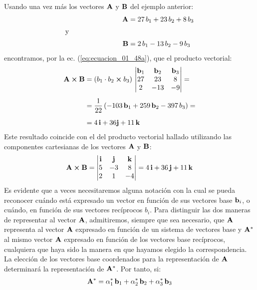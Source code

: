 Usando una vez más los vectores $\vb{A}$ y $\vb{B}$ del ejemplo anterior:
\begin{align*}
    \vb{A} &= 27 \, b_{1} + 23 \, b_{2} + 8 \, b_{3} \\[0.25em]
    \text{y} \hspace{3cm} &{} \\[0.25em]
    \vb{B} &= 2 \, b_{1} - 13 \, b_{2} - 9 \, b_{3}
\end{align*}
encontramos, por la ec. (\ref{eq:ecuacion_01_48a}), que el producto vectorial:
\begin{eqnarray*}
\begin{aligned}
\vb{A} \cp \vb{B} &= \left( b_{1} \cdot b_{2} \cp b_{3} \right) \, \mdet{
    \vb{b}_{1} & \vb{b}_{2} & \vb{b}_{3} \\
    27 & 23 & 8 \\
    2 & -13 & -9
} = \\[0.5em]
&= \dfrac{1}{22} \left( -103 \, \vb{b}_{1} + 259 \, \vb{b}_{2} - 397 \, b_{3} \right) = \\[0.5em]
&= 4 \, \vb{i} + 36 \vb{j} + 11 \, \vb{k}
\end{aligned}
\end{eqnarray*}
Este resultado coincide con el del producto vectorial hallado utilizando las componentes cartesianas de los vectores $\vb{A}$ y $\vb{B}$:
\begin{align*}
    \vb{A} \cp \vb{B} = \mdet{
        \vb{i} & \vb{j} & \vb{k} \\
        5 & -3 & 8 \\
        2 & 1 & -4
    } = 4 \, \vb{i} + 36 \, \vb{j} + 11 \, \vb{k}
\end{align*}
Es evidente que a veces necesitaremos alguna notación con la cual se pueda reconocer cuándo está expresado un vector en función de sus vectores base $\vb{b}_{i}$, o cuándo, en función de sus vectores recíprocos $b_{i}$. Para distinguir las dos maneras de representar al vector $\vb{A}$, admitiremos, siempre que sea necesario, que $\vb{A}$ representa al vector $\vb{A}$ expresado en función de un sistema de vectores base y $\vb{A}^{*}$ al mismo vector $\vb{A}$ expresado en función de los vectores base recíprocos, cualquiera que haya sido la manera en que hayamos elegido la correspondencia. La elección de los vectores base coordenados para la representación de $\vb{A}$ determinará la representación de $\vb{A}^{*}$. Por tanto, si:
\begin{align}
    \vb{A}^{*} = \alpha_{1}^{*} \, \vb{b}_{1} + \alpha_{2}^{*} \, \vb{b}_{2} + \alpha_{3}^{*} \, \vb{b}_{3}
    \label{eq:ecuacion_01_49}
\end{align}
